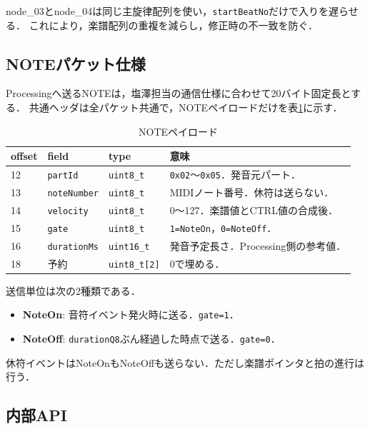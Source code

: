 \documentclass[uplatex,dvipdfmx]{jlreq}
\newcommand{\code}[1]{\texttt{#1}}
\begin{document}
node\_03とnode\_04は同じ主旋律配列を使い，\code{startBeatNo}だけで入りを遅らせる．
これにより，楽譜配列の重複を減らし，修正時の不一致を防ぐ．

\subsection{NOTEパケット仕様}

Processingへ送るNOTEは，塩澤担当の通信仕様に合わせて20バイト固定長とする．
共通ヘッダは全パケット共通で，NOTEペイロードだけを表\ref{tab:note-payload}に示す．

\begin{table}[h]
\centering
\caption{NOTEペイロード}
\label{tab:note-payload}
\begin{tabular}{p{}p{}p{}p{}}
\toprule
\textbf{offset} & \textbf{field} & \textbf{type} & \textbf{意味} \\
\midrule
12 & \code{partId} & \code{uint8\_t} & \code{0x02}〜\code{0x05}．発音元パート．\\
13 & \code{noteNumber} & \code{uint8\_t} & MIDIノート番号．休符は送らない．\\
14 & \code{velocity} & \code{uint8\_t} & 0〜127．楽譜値とCTRL値の合成後．\\
15 & \code{gate} & \code{uint8\_t} & \code{1=NoteOn}，\code{0=NoteOff}．\\
16 & \code{durationMs} & \code{uint16\_t} & 発音予定長さ．Processing側の参考値．\\
18 & 予約 & \code{uint8\_t[2]} & 0で埋める．\\
\bottomrule
\end{tabular}
\end{table}

送信単位は次の2種類である．
\begin{itemize}
  \item \textbf{NoteOn}: 音符イベント発火時に送る．\code{gate=1}．
  \item \textbf{NoteOff}: \code{durationQ8}ぶん経過した時点で送る．\code{gate=0}．
\end{itemize}

休符イベントはNoteOnもNoteOffも送らない．ただし楽譜ポインタと拍の進行は行う．

\subsection{内部API}
\end{document}

